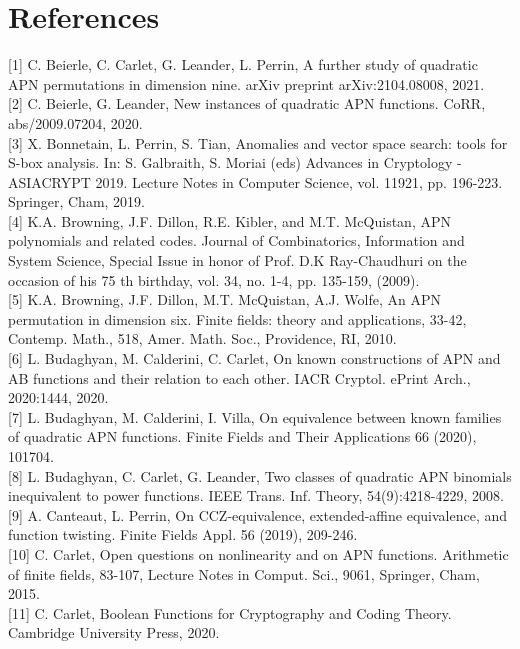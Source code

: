 \documentclass[10pt]{article}
\begin{document}
\section*{References}
[1] C. Beierle, C. Carlet, G. Leander, L. Perrin, A further study of quadratic APN permutations in dimension nine. arXiv preprint arXiv:2104.08008, 2021.\\[0pt]
[2] C. Beierle, G. Leander, New instances of quadratic APN functions. CoRR, abs/2009.07204, 2020.\\[0pt]
[3] X. Bonnetain, L. Perrin, S. Tian, Anomalies and vector space search: tools for S-box analysis. In: S. Galbraith, S. Moriai (eds) Advances in Cryptology - ASIACRYPT 2019. Lecture Notes in Computer Science, vol. 11921, pp. 196-223. Springer, Cham, 2019.\\[0pt]
[4] K.A. Browning, J.F. Dillon, R.E. Kibler, and M.T. McQuistan, APN polynomials and related codes. Journal of Combinatorics, Information and System Science, Special Issue in honor of Prof. D.K Ray-Chaudhuri on the occasion of his 75 th birthday, vol. 34, no. 1-4, pp. 135-159, (2009).\\[0pt]
[5] K.A. Browning, J.F. Dillon, M.T. McQuistan, A.J. Wolfe, An APN permutation in dimension six. Finite fields: theory and applications, 33-42, Contemp. Math., 518, Amer. Math. Soc., Providence, RI, 2010.\\[0pt]
[6] L. Budaghyan, M. Calderini, C. Carlet, On known constructions of APN and AB functions and their relation to each other. IACR Cryptol. ePrint Arch., 2020:1444, 2020.\\[0pt]
[7] L. Budaghyan, M. Calderini, I. Villa, On equivalence between known families of quadratic APN functions. Finite Fields and Their Applications 66 (2020), 101704.\\[0pt]
[8] L. Budaghyan, C. Carlet, G. Leander, Two classes of quadratic APN binomials inequivalent to power functions. IEEE Trans. Inf. Theory, 54(9):4218-4229, 2008.\\[0pt]
[9] A. Canteaut, L. Perrin, On CCZ-equivalence, extended-affine equivalence, and function twisting. Finite Fields Appl. 56 (2019), 209-246.\\[0pt]
[10] C. Carlet, Open questions on nonlinearity and on APN functions. Arithmetic of finite fields, 83-107, Lecture Notes in Comput. Sci., 9061, Springer, Cham, 2015.\\[0pt]
[11] C. Carlet, Boolean Functions for Cryptography and Coding Theory. Cambridge University Press, 2020.\\[0pt]
\end{document}

